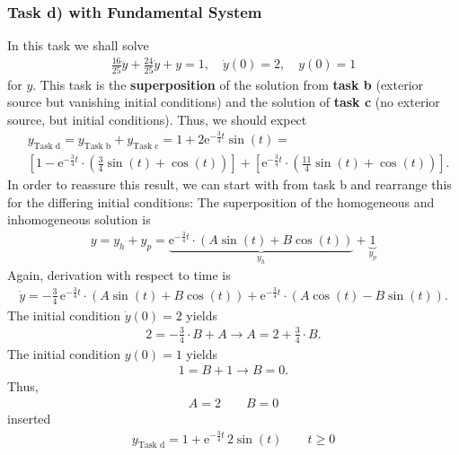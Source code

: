 \subsubsection{Task d) with Fundamental System}
In this task we shall solve
\begin{align}
\frac{16}{25} \ddot{y} + \frac{24}{25} \dot{y} + y = 1, \quad
\dot{y}(0) = 2,\quad y(0)=1
\end{align}
for $y$.
%
This task is the \textbf{superposition} of the solution from \textbf{task b} (exterior source
but vanishing initial conditions) and the solution of \textbf{task c} (no exterior
source, but initial conditions). Thus, we should expect
\begin{align}
&y_\text{Task d} =
y_\text{Task b} +
y_\text{Task c} = 1 + 2\mathrm{e}^{-\frac{3}{4} t} \sin(t) = \nonumber\\
&\left[1 - \mathrm{e}^{-\frac{3}{4} t} \cdot
\left( \frac{3}{4} \sin(t) + \cos(t)\right)\right]
+\left[\mathrm{e}^{-\frac{3}{4} t} \cdot
\left( \frac{11}{4} \sin(t) + \cos(t)\right)\right].
\end{align}
%
In order to reassure this result, we can start with  from
task b and rearrange this for the differing initial conditions:
The superposition of the homogeneous and inhomogeneous solution is
\begin{align}
y = y_h + y_p = \underbrace{
\mathrm{e}^{-\frac{3}{4} t} \cdot
\left( A \sin(t) + B \cos(t)\right)}_{y_h} + \underbrace{1}_{y_p}
\end{align}
Again, derivation with respect to time is
\begin{align}
\dot{y}
=
-\frac{3}{4}\,\mathrm{e}^{-\frac{3}{4} t} \cdot
\left( A \sin(t) + B \cos(t)\right)
+
\mathrm{e}^{-\frac{3}{4} t} \cdot
\left( A \cos(t)  - B \sin(t)\right).
\end{align}
The initial condition $\dot{y}(0) = 2$ yields
\begin{align}
2 = -\frac{3}{4}\cdot B + A \rightarrow A = 2 +  \frac{3}{4}\cdot B.
\end{align}
The initial condition ${y}(0) = 1$ yields
\begin{align}
1 = B  + 1 \rightarrow B = 0.
\end{align}
Thus,
\begin{align}
A = 2\qquad B = 0
\end{align}
inserted
\begin{align}
\boxed{
y_\text{Task d} =
1+\mathrm{e}^{-\frac{3}{4} t}
\, 2 \sin(t)\qquad t \geq 0
}
\end{align}
